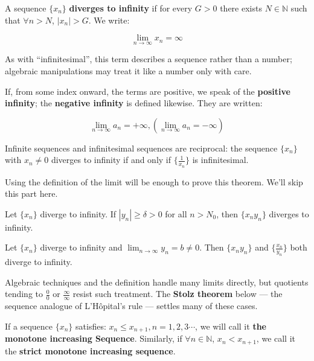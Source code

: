 \begin{definition}[Infinity]
A sequence $\{x_n\}$ \textbf{diverges to infinity} if for every $G>0$ there exists $N \in \mathbb{N}$ such that $\forall n > N$, $|x_n|>G$. We write:

\[\lim_{n \to \infty} x_n = \infty\]

\end{definition}

As with ``infinitesimal'', this term describes a sequence rather than a number; algebraic manipulations may treat it like a number only with care.

If, from some index onward, the terms are positive, we speak of the \textbf{positive infinity}; the \textbf{negative infinity} is defined likewise. They are written:

\[
\lim_{n \to \infty} a_n = + \infty,(\lim_{n \to \infty} a_n = - \infty)
\]

\begin{theorem}
Infinite sequences and infinitesimal sequences are reciprocal: the sequence $\{x_n\}$ with $x_n \neq 0$ diverges to infinity if and only if $\{\frac{1}{x_n}\}$ is infinitesimal.
\end{theorem}

Using the definition of the limit will be enough to prove this theorem. We'll skip this part here.

\begin{theorem}
Let $\{x_n\}$ diverge to infinity. If $|y_n| \ge \delta >0$ for all $n>N_0$, then $\{x_n y_n\}$ diverges to infinity.
\end{theorem}

\begin{inference}
Let $\{x_n\}$ diverge to infinity and $\lim_{n \to \infty} y_n = b \neq 0$. Then $\{x_n y_n\}$ and $\{\frac{x_n}{y_n}\}$ both diverge to infinity.
\end{inference}

Algebraic techniques and the definition handle many limits directly, but quotients tending to $\frac{0}{0}$ or $\frac{\infty}{\infty}$ resist such treatment. The \textbf{Stolz theorem} below — the sequence analogue of L'Hôpital's rule — settles many of these cases.

\begin{definition}
If a sequence $\{x_n\}$ satisfies: $x_n \leq x_{n+1}, n=1,2,3\cdots$, we will call it \textbf{the monotone increasing Sequence}. Similarly, if $\forall n \in \mathbb{N}$, $x_n < x_{n+1}$, we call it the \textbf{strict monotone increasing sequence}.
\end{definition}

